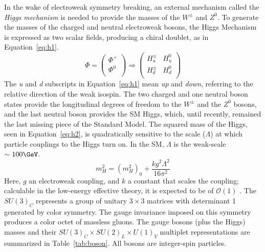 In the wake of electroweak symmetry breaking, an external mechanism called the \textit{Higgs mechanism} is needed to provide the masses of the $W^\pm$ and $Z^0$.  To generate the masses of the charged and neutral electroweak bosons, the Higgs Mechanism is expressed as two scalar fields, producing a chiral doublet, as in Equation~\ref{eq:h1}.
\begin{equation}
\Phi= \begin{pmatrix}
\Phi^+ \\
\Phi^0 \\
\end{pmatrix} \Rightarrow
\begin{pmatrix}
H^\pm_u & H^0_u \\
H^\pm_d & H^0_d  \\
\end{pmatrix}
\label{eq:h1}
\end{equation}
The \textit{u} and \textit{d} subscripts in Equation~\ref{eq:h1} mean \textit{up} and \textit{down}, referring to the relative direction of the weak isospin.  The two charged and one neutral boson states provide the longitudinal degrees of freedom to the $W^\pm$ and the $Z^0$ bosons, and the last neutral boson provides the SM Higgs, which, until recently, remained the last missing piece of the Standard Model.  The squared mass of the Higgs, seen in Equation~\ref{eq:h2}, is quadratically sensitive to the scale ($\Lambda$) at which particle couplings to the Higgs turn on. In the SM, $\Lambda$ is the weak-scale $\sim 100\GeV$. 
 \begin{equation}
 m_H^2 = (m_H^2)_0+\frac{kg^2\Lambda^2}{16\pi^2}
 \label{eq:h2}
 \end{equation}
  Here, $g$ an electroweak coupling, and $k$ a constant that scales the coupling; calculable in the low-energy effective theory, it is expected to be of $\mathcal{O}(1)$ \cite{haber}. 
The $SU(3)_C$ represents a group of unitary $3\times3$ matrices with determinant 1 generated by color symmetry.  The gauge invariance imposed on this symmetry produces a color octet of massless gluons.  The gauge bosons (plus the Higgs) masses and their $SU(3)_{C} \times SU(2)_{L} \times U(1)_{Y}$ multiplet representations are summarized in Table~\ref{tab:boson}.  All bosons are integer-spin particles.      
